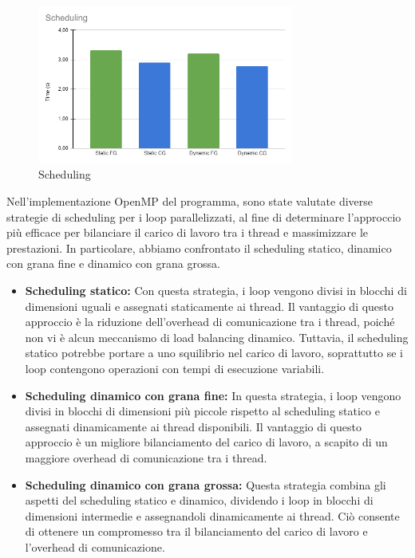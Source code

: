 \documentclass[a4paper,12pt, oneside]{article}
\begin{document}
\begin{figure}[h]
    \centering
    \includegraphics[width=0.75\textwidth]{scheduling.png}
    \caption{Scheduling}
    \label{fig:scheduling}
\end{figure}

Nell'implementazione OpenMP del programma, sono state valutate diverse strategie di scheduling
per i loop parallelizzati, al fine di determinare l'approccio più efficace per bilanciare il
carico di lavoro tra i thread e massimizzare le prestazioni. In particolare, abbiamo
confrontato il scheduling statico, dinamico con grana fine e dinamico con grana grossa.

\begin{itemize}
\item \textbf{Scheduling statico:} Con questa strategia, i loop vengono divisi in blocchi di
dimensioni uguali e assegnati staticamente ai thread. Il vantaggio di questo approccio è la
riduzione dell'overhead di comunicazione tra i thread, poiché non vi è alcun meccanismo di
load balancing dinamico. Tuttavia, il scheduling statico potrebbe portare a uno squilibrio nel
carico di lavoro, soprattutto se i loop contengono operazioni con tempi di esecuzione variabili.
\item \textbf{Scheduling dinamico con grana fine:} In questa strategia, i loop vengono divisi
in blocchi di dimensioni più piccole rispetto al scheduling statico e assegnati dinamicamente
ai thread disponibili. Il vantaggio di questo approccio è un migliore bilanciamento del carico
di lavoro, a scapito di un maggiore overhead di comunicazione tra i thread.
\item \textbf{Scheduling dinamico con grana grossa:} Questa strategia combina gli aspetti del
scheduling statico e dinamico, dividendo i loop in blocchi di dimensioni intermedie e
assegnandoli dinamicamente ai thread. Ciò consente di ottenere un compromesso tra il bilanciamento
del carico di lavoro e l'overhead di comunicazione.
\end{itemize}
\end{document}
